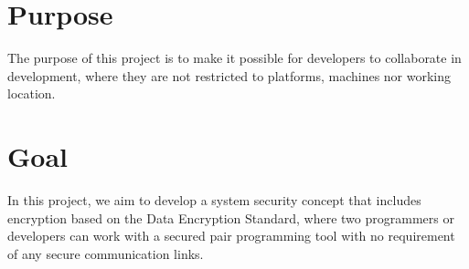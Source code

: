 \section{Purpose}

The purpose of this project is to make it possible for developers to collaborate in development, where they are not restricted to platforms, machines nor working location. 

\section{Goal}

In this project, we aim to develop a system security concept that includes encryption based on the Data Encryption Standard, where two programmers or developers can work with a secured pair programming tool with no requirement of any secure communication links. 
